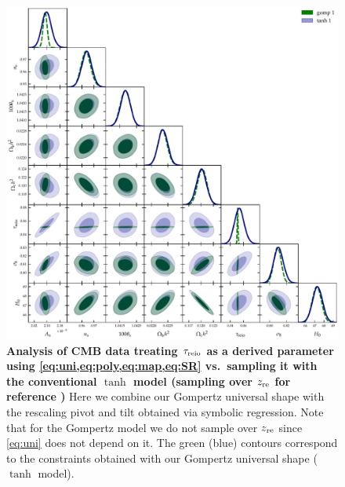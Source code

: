 \begin{figure}[tb]
\centering
\includegraphics[width=\linewidth]{figs/gomp_tanh_triangle_kill_full.pdf}
\caption{\textbf{Analysis of CMB data treating $\tau_{\mathrm{reio}}$ as a derived
parameter using \cref{eq:uni,eq:poly,eq:map,eq:SR} vs.\ sampling it with
the conventional $\tanh$ model (sampling over $z_{\mathrm{re}}$ for reference
)
} 
Here we combine our Gompertz universal shape with the rescaling pivot
and tilt obtained via symbolic regression.
Note that for the Gompertz model we do not sample over $z_{\mathrm{re}}$ since
\cref{eq:uni} does not depend on it.
The green (blue) contours correspond to the constraints obtained with
our Gompertz universal shape ($\tanh$ model).}
\label{fig:unleashed_gomp}
\end{figure}



